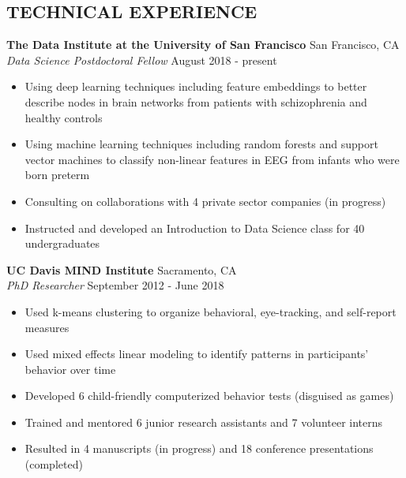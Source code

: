 \documentclass[line,margin,10pt]{res}
\begin{document}
\begin{resume}
\section{TECHNICAL EXPERIENCE}
\textbf{The Data Institute at the University of San Francisco} \hfill San Francisco, CA \\
{\sl Data Science Postdoctoral Fellow} \hfill August 2018 - present
\begin{itemize} \itemsep -2pt
\item Using deep learning techniques including feature embeddings to better describe nodes in brain networks from patients with schizophrenia and healthy controls
\item Using machine learning techniques including random forests and support vector machines to classify non-linear features in EEG from infants who were born preterm
\item Consulting on collaborations with 4 private sector companies (in progress)
\item Instructed and developed an Introduction to Data Science class for 40 undergraduates
\end{itemize}

\textbf{UC Davis MIND Institute} \hfill Sacramento, CA \\
{\sl PhD Researcher} \hfill September 2012 - June 2018
\begin{itemize} \itemsep -2pt
\item Used k-means clustering to organize behavioral, eye-tracking, and self-report measures
\item Used mixed effects linear modeling to identify patterns in participants' behavior over time
\item Developed 6 child-friendly computerized behavior tests (disguised as games)
\item Trained and mentored 6 junior research assistants and 7 volunteer interns
\item Resulted in 4 manuscripts (in progress) and 18 conference presentations (completed)
\end{itemize}


\end{resume}
\end{document}
